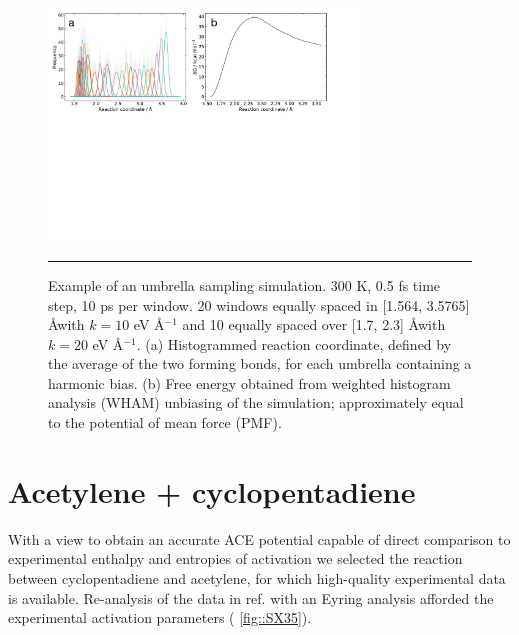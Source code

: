 \documentclass[11pt]{article}
\numberwithin{equation}{subsection}
\begin{document}
\begin{figure}[h!]
	\centering
	\vspace{0.4cm}
	\includegraphics[height=6.2cm]{figSX34.pdf}
	\vspace{0.1cm}
	\hrule
	\vspace{0.1cm}
	\caption{Example of an umbrella sampling simulation. 300 K, 0.5 fs time step, 10 ps per window. 20 windows equally spaced in [1.564, 3.5765] \AA with $k = 10$ eV \AA${}^{-1}$ and 10 equally spaced over [1.7, 2.3] \AA with $k = 20$ eV \AA${}^{-1}$. (a) Histogrammed reaction coordinate, defined by the average of the two forming bonds, for each umbrella containing a harmonic bias. (b) Free energy obtained from weighted histogram analysis (WHAM) unbiasing of the simulation; approximately equal to the potential of mean force (PMF).}
	\label{fig::SX34}
\end{figure}



\clearpage 
\section{Acetylene + cyclopentadiene} \label{section::SI_R4}

With a view to obtain an accurate ACE potential capable of direct comparison to experimental enthalpy and entropies of activation we selected the reaction between cyclopentadiene and acetylene, for which high-quality experimental data is available. Re-analysis of the data in ref. \cite{Walsh1975} with an Eyring analysis afforded the experimental activation parameters (\figurename{ \ref{fig::SX35}}).
\end{document}

